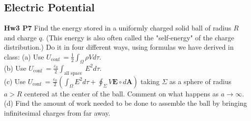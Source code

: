 \documentclass{beamer}
\begin{document}
\subsection{\bf Electric Potential}

\begin{frame}{\bf Hw3 P7}
    Find the energy stored in a uniformly charged solid ball of radius $R$ and charge $q$. (This energy is also often called the "self-energy" of the charge distribution.) Do it in four different ways, using formulas we have derived in class:
(a) Use $U_{\text {conf }}=\frac{1}{2} \int_{\Omega} \rho V d \tau$. \\
(b) Use $U_{\text {conf }}=\frac{\varepsilon_{0}}{2} \int_{\text {all space }} E^{2} d \tau$. \\
(c) Use $U_{\text {conf }}=\frac{\varepsilon_{0}}{2}\left(\int_{\Omega} E^{2} d \tau+\oint_{\Sigma} V \mathbf{E} \circ d \mathbf{A}\right)$ taking $\Sigma$ as a sphere of radius $a>R$ centered at the center of the ball. Comment on what happens as $a \rightarrow \infty$. \\
(d) Find the amount of work needed to be done to assemble the ball by bringing infinitesimal charges from far away. 
\end{frame}
\end{document}
